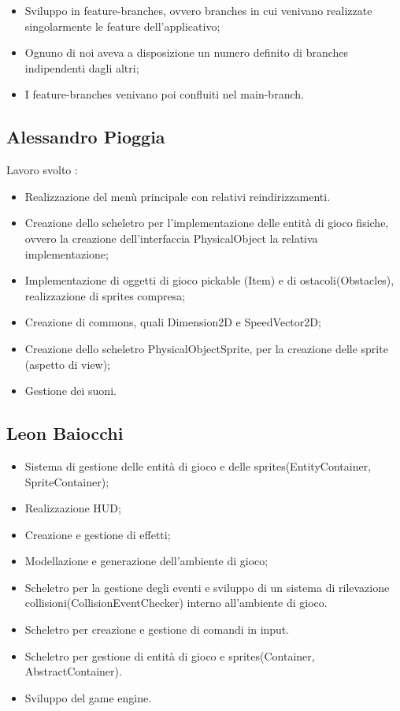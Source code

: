 \begin{itemize}
	\item Sviluppo in feature-branches, ovvero branches in cui venivano realizzate singolarmente le feature dell'applicativo;
	\item Ognuno di noi aveva a disposizione un numero definito di branches indipendenti dagli altri;
	\item I feature-branches venivano poi confluiti nel main-branch.
\end{itemize}

\subsection*{Alessandro Pioggia}
Lavoro svolto : 
\begin{itemize}
	\item Realizzazione del menù principale con relativi reindirizzamenti.
	\item Creazione dello scheletro per l'implementazione delle entità di gioco fisiche, ovvero la creazione dell'interfaccia PhysicalObject la relativa implementazione;
	\item Implementazione di oggetti di gioco pickable (Item) e di ostacoli(Obstacles), realizzazione di sprites compresa;
	\item Creazione di commons, quali Dimension2D e SpeedVector2D;
	\item Creazione dello scheletro PhysicalObjectSprite, per la creazione delle sprite (aspetto di view);
	\item Gestione dei suoni.
\end{itemize}


\subsection*{Leon Baiocchi}
    
\begin{itemize}
	\item Sistema di gestione delle entità di gioco e delle sprites(EntityContainer, SpriteContainer);
	\item Realizzazione HUD;
	\item Creazione e gestione di effetti;
	\item Modellazione e generazione dell'ambiente di gioco;
	\item Scheletro per la gestione degli eventi e sviluppo di un sistema di rilevazione collisioni(CollisionEventChecker) interno all'ambiente di gioco.
	\item Scheletro per creazione e gestione di comandi in input.
	\item Scheletro per gestione di entità di gioco e sprites(Container, AbstractContainer).
	\item Sviluppo del game engine.
\end{itemize}

